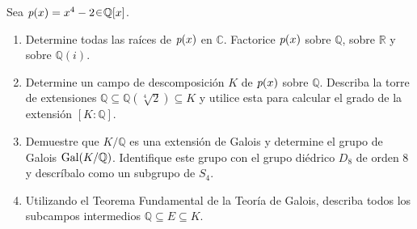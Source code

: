 \begin{ejer}
Sea $\p(x) = x^4 - 2 \en \mathbb{Q}[x]$.
\begin{enumerate}[label=\alph*)]
\item Determine todas las raíces de $\operatorname{\textit{p}}(x)$ en $\mathbb{C}$. Factorice $\operatorname{\textit{p}}(x)$ sobre $\mathbb{Q}$, sobre $\mathbb{R}$ y sobre $\mathbb{Q}(i)$.

\item Determine un campo de descomposición $K$ de $\operatorname{\textit{p}}(x)$ sobre $\mathbb{Q}$. Describa la torre de extensiones $\mathbb{Q} \subseteq \mathbb{Q}(\sqrt[4]{2}) \subseteq K$ y utilice esta para calcular el grado de la extensión $[K : \mathbb{Q}]$.

\item Demuestre que $K / \mathbb{Q}$ es una extensión de Galois y determine el grupo de Galois $\operatorname{Gal}(K / \mathbb{Q})$. Identifique este grupo con el grupo diédrico $D_8$ de orden 8 y descríbalo como un subgrupo de $S_4$.

\item Utilizando el Teorema Fundamental de la Teoría de Galois, describa todos los subcampos intermedios $\mathbb{Q} \subseteq E \subseteq K$.
\end{enumerate}
\end{ejer}
